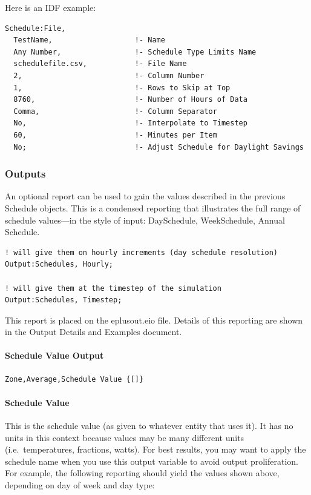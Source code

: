 Here is an IDF example:

\begin{lstlisting}
Schedule:File,
  TestName,                   !- Name
  Any Number,                 !- Schedule Type Limits Name
  schedulefile.csv,           !- File Name
  2,                          !- Column Number
  1,                          !- Rows to Skip at Top
  8760,                       !- Number of Hours of Data
  Comma,                      !- Column Separator
  No,                         !- Interpolate to Timestep
  60,                         !- Minutes per Item
  No;                         !- Adjust Schedule for Daylight Savings
\end{lstlisting}

\subsubsection{Outputs}\label{outputs-031}

An optional report can be used to gain the values described in the previous Schedule objects. This is a condensed reporting that illustrates the full range of schedule values---in the style of input: DaySchedule, WeekSchedule, Annual Schedule.

\begin{lstlisting}
! will give them on hourly increments (day schedule resolution)
Output:Schedules, Hourly;

! will give them at the timestep of the simulation
Output:Schedules, Timestep;
\end{lstlisting}

This report is placed on the eplusout.eio file. Details of this reporting are shown in the Output Details and Examples document.

\paragraph{Schedule Value Output}\label{schedule-value-output}

\begin{lstlisting}
Zone,Average,Schedule Value {[]}
\end{lstlisting}

\paragraph{Schedule Value}\label{schedule-value}

This is the schedule value (as given to whatever entity that uses it). It has no units in this context because values may be many different units (i.e.~temperatures, fractions, watts). For best results, you may want to apply the schedule name when you use this output variable to avoid output proliferation. For example, the following reporting should yield the values shown above, depending on day of week and day type:

